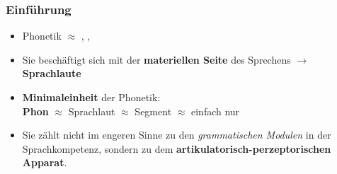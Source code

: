 \begin{frame}
\frametitle{Einführung}

	\begin{itemize}
		\item Phonetik $\approx$ , , 
\medskip
		\item Sie beschäftigt sich mit der \textbf{materiellen Seite} des Sprechens $\rightarrow$ \textbf{Sprachlaute}
\medskip
		\item \textbf{Minimaleinheit} der Phonetik:\\
			\textbf{Phon} $\approx$ Sprachlaut $\approx$ Segment $\approx$ einfach nur 
\medskip
		\item Sie zählt nicht im engeren Sinne zu den \textit{grammatischen Modulen} in der Sprachkompetenz, sondern zu dem \textbf{artikulatorisch-perzeptorischen Apparat}.
	\end{itemize}
	
\end{frame}


